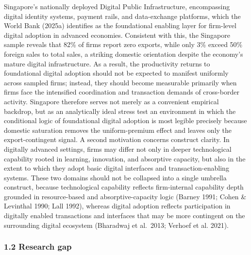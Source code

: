 \documentclass[
  12pt,a4paper]{article}
\begin{document}
Singapore's nationally deployed Digital Public Infrastructure,
encompassing digital identity systems, payment rails, and data-exchange
platforms, which the World Bank (2025a) identifies as the foundational
enabling layer for firm-level digital adoption in advanced economies.
Consistent with this, the Singapore sample reveals that 82\% of firms
report zero exports, while only 3\% exceed 50\% foreign sales to total
sales, a striking domestic orientation despite the economy's mature
digital infrastructure. As a result, the productivity returns to
foundational digital adoption should not be expected to manifest
uniformly across sampled firms; instead, they should become measurable
primarily when firms face the intensified coordination and transaction
demands of cross-border activity. Singapore therefore serves not merely
as a convenient empirical backdrop, but as an analytically ideal stress
test an environment in which the conditional logic of foundational
digital adoption is most legible precisely because domestic saturation
removes the uniform-premium effect and leaves only the export-contingent
signal. A second motivation concerns construct clarity. In digitally
advanced settings, firms may differ not only in deeper technological
capability rooted in learning, innovation, and absorptive capacity, but
also in the extent to which they adopt basic digital interfaces and
transaction-enabling systems. These two domains should not be collapsed
into a single umbrella construct, because technological capability
reflects firm-internal capability depth grounded in resource-based and
absorptive-capacity logic (Barney 1991; Cohen \& Levinthal 1990; Lall
1992), whereas digital adoption reflects participation in digitally
enabled transactions and interfaces that may be more contingent on the
surrounding digital ecosystem (Bharadwaj et al.~2013; Verhoef et al.
2021).

\hypertarget{research-gap}{%
\subsubsection{1.2 Research gap}\label{research-gap}}
\end{document}
